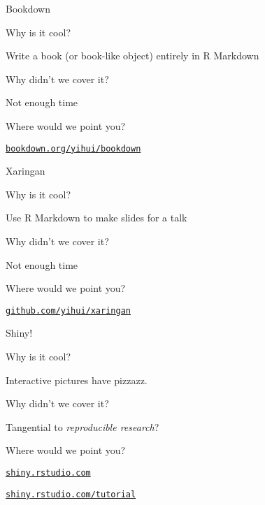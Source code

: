\documentclass[12pt,t]{beamer}
\begin{document}
\begin{frame}[c]{Bookdown}

  \bbi
\item[] Why is it cool?
  \bi
\item Write a book (or book-like object) entirely in R Markdown
  \ei
\item[] Why didn't we cover it?
    \bi
    \item Not enough time
    \ei
\item[] Where would we point you?
    \bi
  \item \href{https://bookdown.org/yihui/bookdown/}{\tt bookdown.org/yihui/bookdown}
   \ei
\ei


\end{frame}







\begin{frame}[c]{Xaringan}

  \bbi
\item[] Why is it cool?
  \bi
\item Use R Markdown to make slides for a talk
  \ei
\item[] Why didn't we cover it?
    \bi
    \item Not enough time
    \ei
\item[] Where would we point you?
    \bi
  \item \href{http://github.com/yihui/xaringan}{\tt github.com/yihui/xaringan}
   \ei
\ei


\end{frame}





\begin{frame}[c]{Shiny!}

  \bbi
\item[] Why is it cool?
  \bi
\item Interactive pictures have pizzazz.
  \ei
\item[] Why didn't we cover it?
    \bi
    \item Tangential to \emph{reproducible research}?
    \ei
\item[] Where would we point you?
    \bi
  \item \href{http://shiny.rstudio.com/}{\tt shiny.rstudio.com}
  \item \href{http://shiny.rstudio.com/tutorial}{\tt shiny.rstudio.com/tutorial}
   \ei
\ei


\end{frame}
\end{document}
